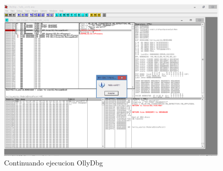 \begin{figure}[ht]
  \includegraphics[width=\linewidth]{figs/fig8.png}
  \caption{Continuando ejecucion OllyDbg}
  \label{fig:8}
\end{figure}


